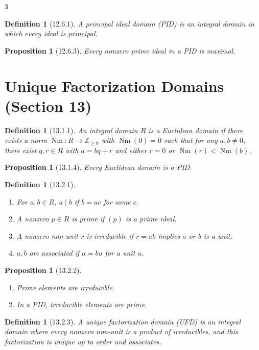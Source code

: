 \documentclass[10pt,landscape]{article}
\newtheorem{definition}[theorem]{Definition}
\newtheorem{proposition}[theorem]{Proposition}
\begin{document}
\begin{multicols}{3}
\begin{definition}[12.6.1]
A principal ideal domain (PID) is an integral domain in which every ideal is principal.
\end{definition}

\begin{proposition}[12.6.3]
Every nonzero prime ideal in a PID is maximal.
\end{proposition}

\section{Unique Factorization Domains (Section 13)}

\begin{definition}[13.1.1]
An integral domain $R$ is a Euclidean domain if there exists a norm $\operatorname{Nm}:R\to \mathbb{Z}_{\ge0}$ with $\operatorname{Nm}(0)=0$ such that for any $a,b\neq0$, there exist $q,r\in R$ with $a=bq+r$ and either $r=0$ or $\operatorname{Nm}(r)<\operatorname{Nm}(b)$.
\end{definition}

\begin{proposition}[13.1.4]
Every Euclidean domain is a PID.
\end{proposition}

\begin{definition}[13.2.1]
\begin{enumerate}
\item For $a,b\in R$, $a\mid b$ if $b=ac$ for some $c$.
\item A nonzero $p\in R$ is prime if $(p)$ is a prime ideal.
\item A nonzero non-unit $r$ is irreducible if $r=ab$ implies $a$ or $b$ is a unit.
\item $a,b$ are associated if $a=bu$ for a unit $u$.
\end{enumerate}
\end{definition}

\begin{proposition}[13.2.2]
\begin{enumerate}
\item Prime elements are irreducible.
\item In a PID, irreducible elements are prime.
\end{enumerate}
\end{proposition}

\begin{definition}[13.2.3]
A unique factorization domain (UFD) is an integral domain where every nonzero non-unit is a product of irreducibles, and this factorization is unique up to order and associates.
\end{definition}


\end{multicols}
\end{document}
